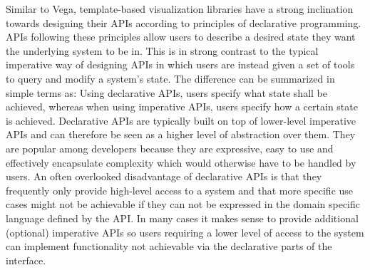 Similar to Vega, template-based visualization libraries have a strong inclination towards designing their APIs according to principles of declarative programming.
APIs following these principles allow users to describe a desired state they want the underlying system to be in.
This is in strong contrast to the typical imperative way of designing APIs in which users are instead given a set of tools to query and modify a system's state.
The difference can be summarized in simple terms as: Using declarative APIs, users specify what state shall be achieved, whereas when using imperative APIs, users specify how a certain state is achieved.
Declarative APIs are typically built on top of lower-level imperative APIs and can therefore be seen as a higher level of abstraction over them.
They are popular among developers because they are expressive, easy to use and effectively encapsulate complexity which would otherwise have to be handled by users.
An often overlooked disadvantage of declarative APIs is that they frequently only provide high-level access to a system and that more specific use cases might not be achievable if they can not be expressed in the domain specific language defined by the API.
In many cases it makes sense to provide additional (optional) imperative APIs so users requiring a lower level of access to the system can implement functionality not achievable via the declarative parts of the interface.

